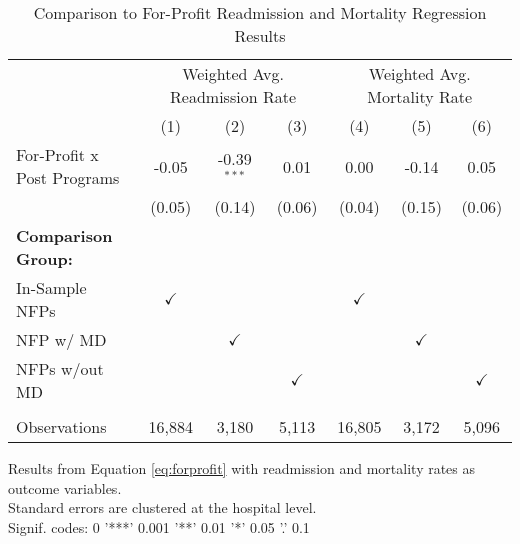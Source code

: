 \begin{table}[ht!]
   \caption{\label{tab:forprofit_readmort_fullsample} Comparison to For-Profit Readmission and Mortality Regression Results}
   \bigskip
   \centering
   \begin{tabular}{lcccccc}
      \toprule
       & \multicolumn{3}{c}{Weighted Avg. Readmission Rate} & \multicolumn{3}{c}{Weighted Avg. Mortality Rate}\\
                                  & (1)           & (2)           & (3)           & (4)           & (5)           & (6)\\  
      \midrule 
      For-Profit x Post Programs  & -0.05         & -0.39$^{***}$ & 0.01          & 0.00          & -0.14         & 0.05\\   
                                  & (0.05)        & (0.14)        & (0.06)        & (0.04)        & (0.15)        & (0.06)\\   
      \textbf{Comparison Group:}  &               &               &               &               &               & \\  
      In-Sample NFPs              & $\checkmark$  &               &               & $\checkmark$  &               & \\  
      NFP w/ MD                   &               & $\checkmark$  &               &               & $\checkmark$  & \\  
      NFPs w/out MD               &               &               & $\checkmark$  &               &               & $\checkmark$\\   
       \\
      Observations                & 16,884        & 3,180         & 5,113         & 16,805        & 3,172         & 5,096\\  
      \bottomrule
   \end{tabular}
   
   \par \raggedright 
   Results from Equation \ref{eq:forprofit} with readmission and mortality rates as outcome variables.\\
   Standard errors are clustered at the hospital level.\\
   Signif. codes: 0 '***' 0.001 '**' 0.01 '*' 0.05 '.' 0.1
\end{table}
